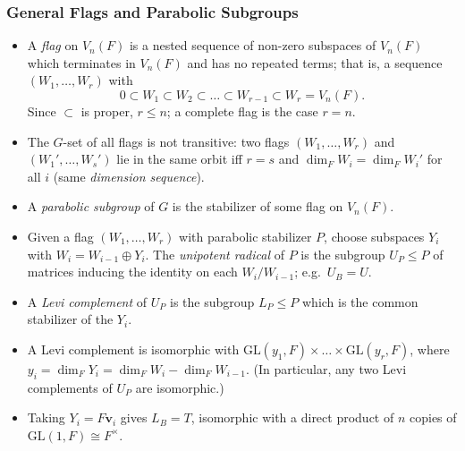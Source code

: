 \documentclass[../Odyssey_Project.tex]{subfiles}
\begin{document}
\subsubsection*{General Flags and Parabolic Subgroups}
\begin{itemize}
    \item A \emph{flag} on $V_n(F)$ is a nested sequence of non-zero subspaces of $V_n(F)$ which terminates in $V_n(F)$ and has no repeated terms; that is, a sequence $(W_1, \dots, W_r)$ with
    \[
        0 \subset W_1 \subset W_2 \subset \dots \subset W_{r-1} \subset W_r = V_n(F).
    \]
    Since $\subset$ is proper, $r \leq n$; a complete flag is the case $r = n$.
    \item The $G$-set of all flags is not transitive: two flags $(W_1, \dots, W_r)$ and $(W_1', \dots, W_s')$ lie in the same orbit iff $r = s$ and $\dim_F W_i = \dim_F W_i'$ for all $i$ (same \emph{dimension sequence}).
    \item A \emph{parabolic subgroup} of $G$ is the stabilizer of some flag on $V_n(F)$.
    \item Given a flag $(W_1, \dots, W_r)$ with parabolic stabilizer $P$, choose subspaces $Y_i$ with $W_i = W_{i-1} \oplus Y_i$. The \emph{unipotent radical} of $P$ is the subgroup $U_P \leq P$ of matrices inducing the identity on each $W_i / W_{i-1}$; e.g.\ $U_B = U$.
    \item A \emph{Levi complement} of $U_P$ is the subgroup $L_P \leq P$ which is the common stabilizer of the $Y_i$.
    \item A Levi complement is isomorphic with $\mathrm{GL}(y_1, F) \times \dots \times \mathrm{GL}(y_r, F)$, where $y_i = \dim_F Y_i = \dim_F W_i - \dim_F W_{i-1}$. (In particular, any two Levi complements of $U_P$ are isomorphic.)
    \item Taking $Y_i = F\mathbf{v}_i$ gives $L_B = T$, isomorphic with a direct product of $n$ copies of $\mathrm{GL}(1, F) \cong F^\times$.
\end{itemize}
\end{document}
